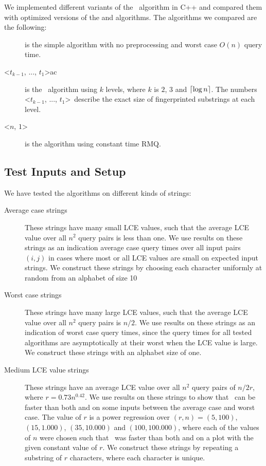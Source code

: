 \documentclass[a4]{article}
\begin{document}
We implemented different variants of the \fprintk\ algorithm in C++ and compared them with optimized versions of the  and  algorithms. The algorithms we compared are the following:
\begin{description}
\item[] is the simple  algorithm with no preprocessing and worst case $O(n)$ query time.
\item[\fprintk\textless$t_{k-1}$, ..., $t_1$\textgreater ac] is the \fprintk\ algorithm using $k$ levels, where $k$ is $2$, $3$ and $\lceil\log n\rceil$. The numbers \textless$t_{k-1}$, ..., $t_1$\textgreater\ describe the exact size of fingerprinted substrings at each level.
\item[\textless$n$, $1$\textgreater] is the  algorithm using constant time RMQ.
\end{description}

\subsection{Test Inputs and Setup}

We have tested the algorithms on different kinds of strings:
\begin{description}
\item[Average case strings] These strings have many small LCE values, such that the average LCE value over all $n^2$ query pairs is less than one. We use results on these strings as an indication average case query times over all input pairs $(i,j)$ in cases where most or all LCE values are small on expected input strings. We construct these strings by choosing each character uniformly at random from an alphabet of size 10
\item[Worst case strings] These strings have many large LCE values, such that the average LCE value over all $n^2$ query pairs is $n/2$. We use results on these strings as an indication of worst case query times, since the query times for all tested algorithms are asymptotically at their worst when the LCE value is large. We construct these strings with an alphabet size of one.
\item[Medium LCE value strings] These strings have an average LCE value over all $n^2$ query pairs of $n/2r$, where $r=0.73n^{0.42}$. We use results on these strings to show that \fprint\ can be faster than both  and  on some inputs between the average case and worst case. The value of $r$ is a power regression over $(r,n) = (5,100)$, $(15,1.000)$, $(35,10.000)$ and $(100,100.000)$, where each of the values of $n$ were chosen such that \fprintk\ was faster than both  and  on a plot with the given constant value of $r$. We construct these strings by repeating a substring of $r$ characters, where each character is unique.
\end{description}
\end{document}

